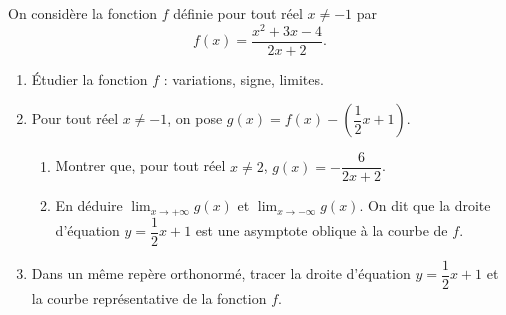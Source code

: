\documentclass[11pt,fleqn, openany]{book} %
\begin{document}
\begin{exercise}
On considère la fonction $f$ définie pour tout réel $x\neq -1$ par 
\[f(x)=\dfrac{x^2+3x-4}{2x+2}.\]
\begin{enumerate}
\item Étudier la fonction $f$ : variations, signe, limites.
\item Pour tout réel $x\neq -1$, on pose $g(x)=f(x)-\left(\dfrac{1}{2}x+1\right)$.
\begin{enumerate}
\item Montrer que, pour tout réel $x\neq 2$, $g(x)=-\dfrac{6}{2x+2}$.
\item En déduire $\displaystyle \lim_{x \to +\infty} g(x)$ et $\displaystyle \lim_{x \to -\infty} g(x)$. On dit que la droite d'équation $y=\dfrac{1}{2}x+1$ est une asymptote oblique à la courbe de $f$.
\end{enumerate}
\item Dans un même repère orthonormé, tracer la droite d'équation $y=\dfrac{1}{2}x+1$ et la courbe représentative de la fonction $f$.
\end{enumerate}
\end{exercise}
\end{document}
